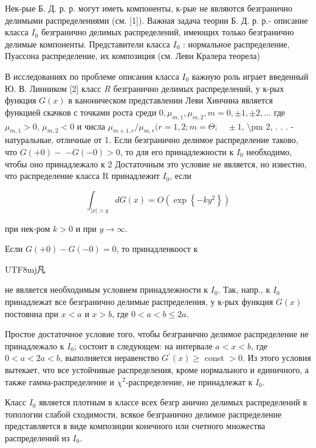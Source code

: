 \documentclass[10pt]{article}
\begin{document}
Нек-рые Б. Д. р. р. могут иметь компоненты, к-рые не являются безгранично делимыми распределениями (см. [1]). Важная задача теории Б. Д. р. р.- описание класса $I_{0}$ безгранично делимых распределений, имеющих только безгранично делимые компоненты. Представители класса $I_{0}$ : нормальное распределение, Пуассона распределение, их композиция (см. Леви Кралера теорела)



В исследованиях по проблеме описания класса $I_{0}$ важную роль играет введенный Ю. В. Линником [2] класс $R$ безгранично делимых распределений, у к-рых функция $G(x)$ в каноническом представлении Леви Хинчина является функцией скачков с точками роста среди $0, \mu_{m, 1}, \mu_{m, 2}, m=0, \pm 1, \pm 2, \ldots$ где $\mu_{m, 1}>0$, $\mu_{m, 2}<0$ и числа $\mu_{m+1, r} / \mu_{m, r}(r=1,2 ; m=\Theta ; \quad \pm 1$, \textbackslash pm 2, . . . - натуральные, отличные от 1. Если безгранично делимое распределение таково, что $G(+0)-$ $-G(-0)>0$, то для его принадлежности к $I_{0}$ необходимо, чтобы оно принадлежало к $\mathfrak{2}$ Достаточным это условие не является, но известно, что распределение класса R принадлежит $I_{0}$, если



\[

\int_{|x|>y} d G(x)=O\left(\exp \left\{-k y^{2}\right\}\right)

\]



при нек-ром $k>0$ и при $y \rightarrow \infty$.



Если $G(+0)-G(-0)=0$, то принадленкоост к \begin{CJK}{UTF8}{mj}凡\end{CJK} не является необходимым условием принадлежности к $I_{0}$. Так, напр., к $I_{0}$ принадлежат все безгранично делимые распределения, у к-рых функция $G(x)$ постоянна при $x<a$ и $x>b$, где $0<a<b \leqslant 2 a$.



Простое достаточное условие того, чтобы безгранично делимое распределение не принадлежало к $I_{0}$; состоит в следующем: на интервале $a<x<b$, где $0<a<2 a<b$, выполняется неравенство $G^{\prime}(x) \geqslant$ const $>0$. Из этого условия вытекает, что все устойчивые распределения, кроме нормального и единичного, а также гамма-раєпределение и $\chi^{2}$-распределение, не принадлежат к $I_{0}$.



Класс $I_{0}$ является плотным в классе всех безгр анично делимых распределений в топологии слабой сходимости, всякое безгранично делимое распределение представляется в виде композиции конечного или счетного множества распределений из $I_{0}$.
\end{document}

